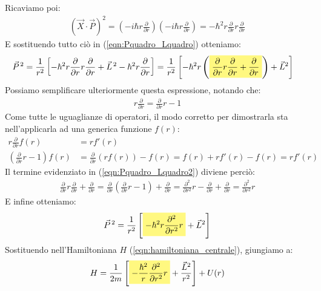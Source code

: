 \documentclass[../../FisicaTeorica.tex]{subfiles}
\begin{document}
Ricaviamo poi:
\begin{align*}
(\vec{X}\cdot \vec{P})^2 = \left(-i\hbar r\frac{\partial}{\partial r}\right)\left(-i\hbar r \frac{\partial}{\partial r}\right) = -\hbar^2 r \frac{\partial}{\partial r} r \frac{\partial}{\partial r}
\end{align*}
E sostituendo tutto ciò in (\ref{eqn:Pquadro_Lquadro}) otteniamo:
\begin{align}
\vec{P}^{\,2} &= \frac{1}{r^2} \left[ -\hbar^2 r \frac{\partial}{\partial r} {r \frac{\partial }{\partial r}} + \vec{L}^{\,2} - \hbar^{2} r \frac{\partial}{\partial r}\right]=\frac{1}{r^2}\left[-\hbar^2 r\left(\hlc{Yellow}{\frac{\partial}{\partial r}r\frac{\partial}{\partial r}+\frac{\partial}{\partial r}}\right) + \vec{L}^2 \right]
\label{eqn:Pquadro_Lquadro2}
\end{align}
Possiamo semplificare ulteriormente questa espressione, notando che:
\begin{align*}
r\frac{\partial}{\partial r} = \frac{\partial}{\partial r}r-1
\end{align*}
Come tutte le uguaglianze di operatori, il modo corretto per dimostrarla sta nell'applicarla ad una generica funzione $f(r)$:
\begin{align*}
r\frac{\partial}{\partial r} f(r)&= r f'(r)\\
\left(\frac{\partial}{\partial r}r-1\right)f(r)&=\frac{\partial}{\partial r}(rf(r))-f(r) = f(r)+rf'(r)-f(r)=rf'(r)
\end{align*}
Il termine evidenziato in (\ref{eqn:Pquadro_Lquadro2}) diviene perciò:
\begin{align*}
\frac{\partial}{\partial r}r\frac{\partial}{\partial r} + \frac{\partial}{\partial r} = \frac{\partial}{\partial r}\left(\frac{\partial}{\partial r}r-1\right)+\frac{\partial}{\partial r}=\frac{\partial^2}{\partial r^2}r-\frac{\partial}{\partial r} + \frac{\partial}{\partial r} =\frac{\partial^2}{\partial r^2}r
\end{align*}
E infine otteniamo:
\begin{align}
\vec{P}^{\,2}=\frac{1}{r^2}\left[\hlc{Yellow}{-\hbar^2r \frac{\partial^2}{\partial r^2}r}+ \vec{L}^2 \right]
\label{eqn:Pquadro_Lquadro3}
\end{align}
Sostituendo nell'Hamiltoniana $H$ (\ref{eqn:hamiltoniana_centrale}), giungiamo a:
\begin{align}
H=\frac{1}{2m}\left[\hlc{Yellow}{-\frac{\hbar^2}{r}\frac{\partial^2}{\partial r^2}r} +\frac{\vec{L}^2}{r^2}\right]+U(r)
\label{eqn:hamiltoniana-centrale}
\end{align}
\end{document}
